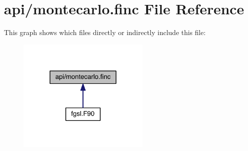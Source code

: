 \hypertarget{montecarlo_8finc}{\section{api/montecarlo.finc File Reference}
\label{montecarlo_8finc}
}
This graph shows which files directly or indirectly include this file\-:\nopagebreak
\begin{figure}[H]
\begin{center}
\leavevmode
\includegraphics[width=180pt]{montecarlo_8finc__dep__incl}
\end{center}
\end{figure}
